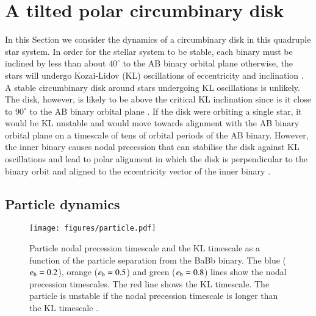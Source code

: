\documentclass{aa}
\begin{document}
\section{A tilted polar circumbinary disk}\label{sec:theory}

In this Section we consider the dynamics of a circumbinary disk in this quadruple star system. 
%
In order for the stellar system to be stable, each binary must be inclined by less than about $40^\circ$ to the AB binary orbital plane otherwise, the stars will undergo Kozai-Lidov (KL) oscillations of eccentricity and inclination \citep{vonZeipel1910,Kozai1962,Lidov1962}.
%
A stable circumbinary disk around stars undergoing KL oscillations is unlikely. 
%
The disk, however, is likely to  be above the critical KL inclination since is it close to $90^\circ$ to the AB binary orbital plane \citep{Lubow2017,Zanazzi2017}.
%
If the disk were orbiting a single star, it would be KL unstable \citep{Martin2014,Fu2015} and would move towards alignment with the AB binary orbital plane on a timescale of tens of orbital periods of the AB binary.
%
However, the inner binary causes nodal precession that can stabilise the disk against KL oscillations \citep{Verrier2009,Martin2022} and lead to polar alignment in which the disk is perpendicular to the binary orbit and aligned to the eccentricity vector of the inner binary \citep{Martin17}.
%


\subsection{Particle dynamics}

\begin{figure}
\begin{center}
    \centering
    \texttt{[image: figures/particle.pdf]}
    \caption{Particle nodal precession timescale and the KL timescale as a function of the particle separation from  the BaBb binary. 
    The blue ($e_{\rm b}=0.2$),  orange ($e_{\rm b}=0.5$) and green ($e_{\rm b}=0.8$) lines show the nodal precession timescales.
    The red line shows the KL timescale.
    The particle is unstable if  the nodal precession timescale is longer than the KL timescale \citep{Verrier2009}. }
\label{fig:particles}
\end{center}
\end{figure}
\end{document}
